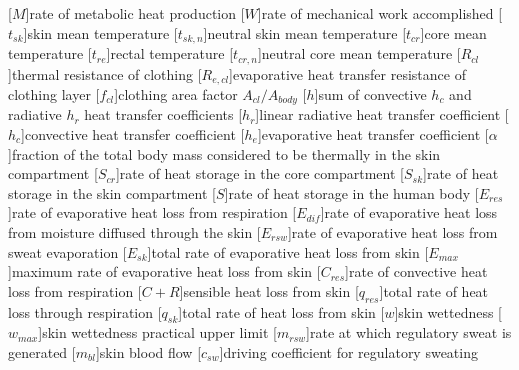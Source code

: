 \begin{acronym}[longest]
    [$M$]{rate of metabolic heat production}
    [$W$]{rate of mechanical work accomplished}
    [$t_{sk}$]{skin mean temperature}
    [$t_{sk,n}$]{neutral skin mean temperature}
    [$t_{cr}$]{core mean temperature}
    [$t_{re}$]{rectal temperature}
    [$t_{cr,n}$]{neutral core mean temperature}
    [$R_{cl}$]{thermal resistance of clothing}
    [$R_{e,cl}$]{evaporative heat transfer resistance of clothing layer}
    [$f_{cl}$]{clothing area factor $A_{cl}/A_{body}$}
    [$h$]{sum of convective $h_{c}$ and radiative $h_{r}$ heat transfer coefficients}
    [$h_{r}$]{linear radiative heat transfer coefficient}
    [$h_{c}$]{convective heat transfer coefficient}
    [$h_{e}$]{evaporative heat transfer coefficient}
    [$\alpha$]{fraction of the total body mass considered
to be thermally in the skin compartment}
        [$S_{cr}$]{rate of heat storage in the core compartment}
    [$S_{sk}$]{rate of heat storage in the skin compartment}
    [$S$]{rate of heat storage in the human body}
    [$E_{res}$]{rate of evaporative heat loss from respiration}
    [$E_{dif}$]{rate of evaporative heat loss from moisture diffused through the skin}
    [$E_{rsw}$]{rate of evaporative heat loss from sweat evaporation}
    [$E_{sk}$]{total rate of evaporative heat loss from skin}
    [$E_{max}$]{maximum rate of evaporative heat loss from skin}
    [$C_{res}$]{rate of convective heat loss from respiration}
    [$C + R$]{sensible heat loss from skin}
    [$q_{res}$]{total rate of heat loss through respiration}
    [$q_{sk}$]{total rate of heat loss from skin}
    [$w$]{skin wettedness}
    [$w_{max}$]{skin wettedness practical upper limit}
    [$m_{rsw}$]{rate at which regulatory sweat is generated}
    [$m_{bl}$]{skin blood flow}
    [$c_{sw}$]{driving coefficient for regulatory sweating}


\end{acronym}
